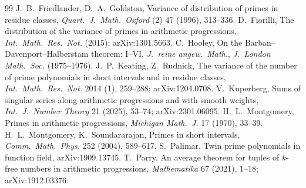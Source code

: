 \documentclass[11pt]{article}
\begin{document}
\begin{thebibliography}{99}
 J.~B.~Friedlander, D.~A.~Goldston, Variance of distribution of primes in residue classes, \emph{Quart.\ J.\ Math.\ Oxford} (2) 47 (1996), 313--336.
 D.~Fiorilli, The distribution of the variance of primes in arithmetic progressions, \emph{Int.\ Math.\ Res.\ Not.} (2015); arXiv:1301.5663.
 C.~Hooley, On the Barban--Davenport--Halberstam theorem: I--VI, \emph{J.\ reine angew.\ Math.}, \emph{J.\ London Math.\ Soc.} (1975--1976).
 J.~P.~Keating, Z.~Rudnick, The variance of the number of prime polynomials in short intervals and in residue classes, \emph{Int.\ Math.\ Res.\ Not.} 2014 (1), 259--288; arXiv:1204.0708.
 V.~Kuperberg, Sums of singular series along arithmetic progressions and with smooth weights, \emph{Int.\ J.\ Number Theory} 21 (2025), 53--74; arXiv:2301.06095.
 H.~L.~Montgomery, Primes in arithmetic progressions, \emph{Michigan Math.\ J.} 17 (1970), 33--39.
 H.~L.~Montgomery, K.~Soundararajan, Primes in short intervals, \emph{Comm.\ Math.\ Phys.} 252 (2004), 589--617.
 S.~Palimar, Twin prime polynomials in function field, arXiv:1909.13745.
 T.~Parry, An average theorem for tuples of $k$-free numbers in arithmetic progressions, \emph{Mathematika} 67 (2021), 1--18; arXiv:1912.03376.
\end{thebibliography}
\end{document}
